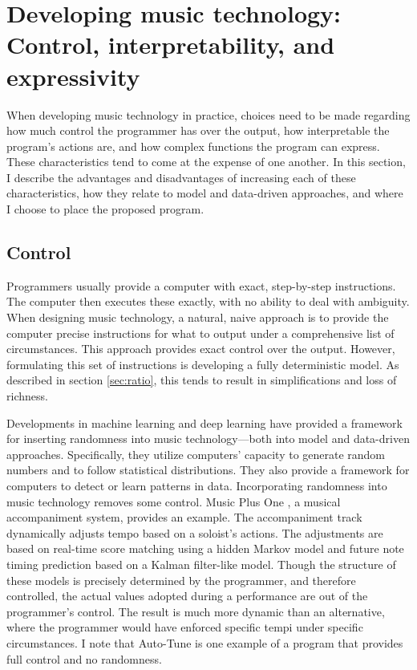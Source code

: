 \section{Developing music technology: Control, interpretability, and expressivity}
\label{sec:control-interpret-express}
When developing music technology in practice, choices need to be made regarding how much control the programmer has over the output, how interpretable the program's actions are, and how complex functions the program can express. These characteristics tend to come at the expense of one another. In this section, I describe the advantages and disadvantages of increasing each of these characteristics, how they relate to model and data-driven approaches, and where I choose to place the proposed program. 

\subsection{Control}
Programmers usually provide a computer with exact, step-by-step instructions. The computer then executes these exactly, with no ability to deal with ambiguity. When designing music technology, a natural, naive approach is to provide the computer precise instructions for what to output under a comprehensive list of circumstances. This approach provides exact control over the output. However, formulating this set of instructions is developing a fully deterministic model. As described in section \ref{sec:ratio}, this tends to result in simplifications and loss of richness.

Developments in machine learning and deep learning have provided a framework for inserting randomness into music technology---both into model and data-driven approaches. Specifically, they utilize computers' capacity to generate random numbers and to follow statistical distributions. They also provide a framework for computers to detect or learn patterns in data. Incorporating randomness into music technology removes some control. Music Plus One \cite{raphael2010music}, a musical accompaniment system, provides an example. The accompaniment track dynamically adjusts tempo based on a soloist's actions. The adjustments are based on real-time score matching using a hidden Markov model and future note timing prediction based on a Kalman filter-like model. Though the structure of these models is precisely determined by the programmer, and therefore controlled, the actual values adopted during a performance are out of the programmer's control. The result is much more dynamic than an alternative, where the programmer would have enforced specific tempi under specific circumstances. I note that Auto-Tune is one example of a program that provides full control and no randomness.

